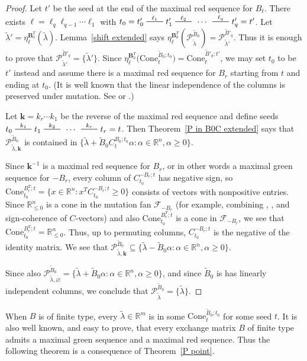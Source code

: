 \documentclass[10pt]{article}
\theoremstyle{definition}
\theoremstyle{remark}
\numberwithin{equation}{section}
\newcommand{\reals}{\mathbb R}
\newcommand{\edge}{\,\,\rule[2.7pt]{20pt}{0.5pt}\,\,}
\newcommand{\set}[1]{{\lbrace #1 \rbrace}}
\newcommand{\F}{{\mathcal F}}
\newcommand{\0}{{\mathbf{0}}}
\newcommand{\Cone}{\mathrm{Cone}}
\newcommand{\kk}{{\boldsymbol{k}}}
\renewcommand{\ll}{{\boldsymbol\ell}}
\newcommand{\tB}{{\widetilde{B}}}
\newcommand{\BB}{\mathbf{B}}
\renewcommand{\P}{\mathcal{P}}
\begin{document}
\begin{proof}%
Let $t'$ be the seed at the end of the maximal red sequence for $B_t$.
There exists $\ll=\ell_q\ell_{q-1}\cdots\ell_1$ with $t_0=t'_0\overset{\ell_1}{\edge}t'_1\overset{\ell_2}{\edge}\,\cdots\,\overset{\ell_q}{\edge}t'_q=t'$.
Let $\tilde\lambda'=\eta^{\BB_0^T}_\ll\!(\tilde\lambda)$.
  Lemma~\ref{shift extended} says $\eta^{\BB_0^T}_\ll\!(\P^{\tB_0}_{\tilde\lambda})=\P^{\tB'_q}_{\tilde\lambda'}$.
Thus it is enough to prove that $\P^{\tB'_q}_{\tilde\lambda'}=\set{\tilde\lambda'}$.
Since $\eta_\ll^{\BB_0^T}\bigl(\Cone_t^{\tB_0;t_0}\bigr)=\Cone_t^{\tB'_q;t'}$, we may set $t_0$ to be $t'$ instead and assume there is a maximal red sequence for $B_r$ starting from $t$ and ending at $t_0$.
(It is well known that the linear independence of the columns is preserved under mutation.
See \cite[Lemma~1.2]{GSV03} or \cite[Lemma~3.2]{ca3}.)

Let $\kk=k_r\cdots k_1$ be the reverse of the maximal red sequence and define seeds $t_0\overset{k_1}{\edge}t_1\overset{k_2}{\edge}\,\cdots\,\overset{k_r}{\edge}t_r=t$.
Then Theorem~\ref{P in B0C extended} says that $\P^{\tB_0}_{\tilde\lambda,\kk}$ is contained in $\set{\tilde\lambda+\tB_0C_t^{B_0;t_0}\alpha:\alpha\in\reals^n,\alpha\ge0}$.

Since $\kk^{-1}$ is a maximal red sequence for $B_r$, or in other words a maximal green sequence for $-B_r$, every column of $C_{t_0}^{-B_r;t}$ has negative sign, so $\Cone_{t_0}^{B_r^T;t}=\set{x\in\reals^n:x^TC_{t_0}^{-B_r;t}\ge0}$ consists of vectors with nonpositive entries.
Since $\reals_{\le0}^n$ is a cone in the mutation fan $\F_{-B_r}$ (for example, combining \mbox{\cite[Proposition~7.1]{universal}}, \mbox{\cite[Proposition~8.9]{universal}}, and sign-coherence of $C$-vectors) and also $\Cone_{t_0}^{B_r^T;t}$ is a cone in $\F_{-B_r}$, we see that $\Cone_{t_0}^{B_r^T;t}=\reals_{\le0}^n$.
Thus, up to permuting columns, $C_{t_0}^{-B_r;t}$ is the negative of the identity matrix.
We see that $\P^{\tB_0}_{\tilde\lambda,\kk}\subseteq\set{\tilde\lambda-\tB_0\alpha:\alpha\in\reals^n,\alpha\ge0}$.

  Since also $\P^{\tB_0}_{\tilde\lambda,\varnothing}=\set{\tilde\lambda+\tB_0\alpha:\alpha\in\reals^n,\alpha\ge0}$, and since $\tB_0$ is has linearly independent columns, we conclude that $\P^{\tB_0}_{\tilde\lambda}=\set{\tilde\lambda}$.
\end{proof}

When $B$ is of finite type, every $\tilde\lambda\in\reals^m$ is in some $\Cone^{\tB_0;t_0}_t$ for some seed $t$.
It is also well known, and easy to prove, that every exchange matrix $B$ of finite type admits a maximal green sequence and a maximal red sequence.
Thus the following theorem is a consequence of Theorem~\ref{P point}.
\end{document}
